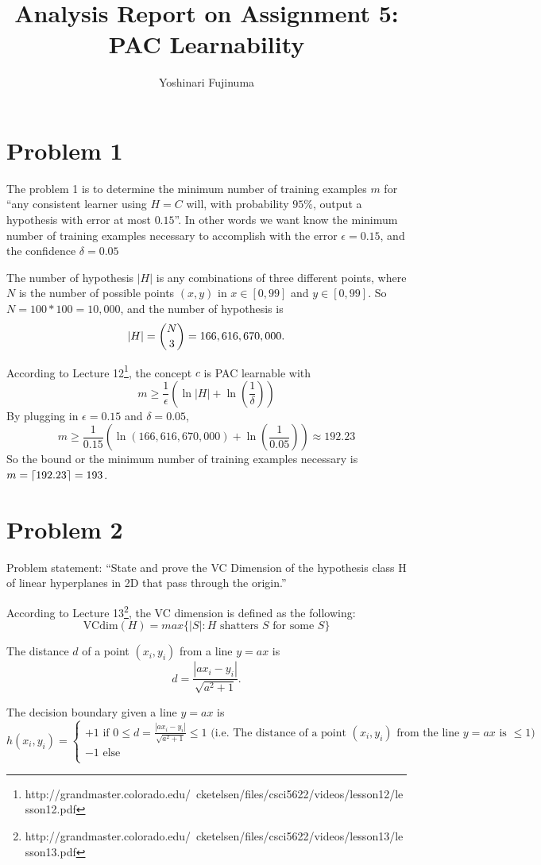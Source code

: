 \documentclass[11pt]{article}
\DeclarePairedDelimiter\ceil{\lceil}{\rceil}
\begin{document}
\title{Analysis Report on Assignment 5: PAC Learnability}
\author{Yoshinari Fujinuma}
\date{}
\maketitle

\section{Problem 1}
The problem 1 is to determine the minimum number of training examples $m$ for ``any consistent learner using $H=C$ will, with probability $95\%$, output a hypothesis with error at most $0.15$''. In other  words we want know the minimum number of training examples necessary to accomplish with the error $\epsilon = 0.15$, and the confidence $\delta = 0.05$

The number of hypothesis $|H|$ is any combinations of three different points, where $N$ is the number of possible points $(x, y)$ in $x \in [0, 99]$ and $y \in [0, 99]$. So $N = 100 * 100 = 10,000$, and the number of hypothesis is
$$
|H| = \dbinom{N}{3} = 166,616,670,000.
$$

According to Lecture 12\footnote{http://grandmaster.colorado.edu/~cketelsen/files/csci5622/videos/lesson12/lesson12.pdf}, the concept $c$ is PAC learnable with 
$$
m \geq \frac{1}{\epsilon}(\ln |H| + \ln(\frac{1}{\delta}))
$$
By plugging in $\epsilon = 0.15$ and $\delta = 0.05$, 
$$
m \geq \frac{1}{0.15}(\ln(166,616,670,000) + \ln(\frac{1}{0.05})) \approx 192.23
$$
So the bound or the minimum number of training examples necessary is $m = \ceil{192.23} = 193$.


\section{Problem 2}
Problem statement: ``State and prove the VC Dimension of the hypothesis class H of linear hyperplanes in 2D that pass through the origin.''

According to Lecture 13\footnote{http://grandmaster.colorado.edu/~cketelsen/files/csci5622/videos/lesson13/lesson13.pdf}, the VC dimension is defined as the following:
$$
\mbox{VCdim}(H) = max\{|S|: H \mbox{ shatters } S \mbox{ for some } S\}
$$

The distance $d$ of a point $(x_i, y_i)$ from a line $y = ax$ is
$$
d = \frac{|ax_i - y_i|}{\sqrt{a^2 + 1}}.
$$

The decision boundary given a line $y = ax$ is
$$ 
h(x_i, y_i) = \begin{cases} 
          +1 \mbox{ if } 0 \leq d = \frac{|ax_i - y_i|}{\sqrt{a^2 + 1}} \leq 1 \mbox{ (i.e. The distance of a point $(x_i, y_i)$ from the line $y = ax$ is $\leq 1$) }\\
          -1 \mbox{ else }\\
\end{cases}
$$
\end{document}
